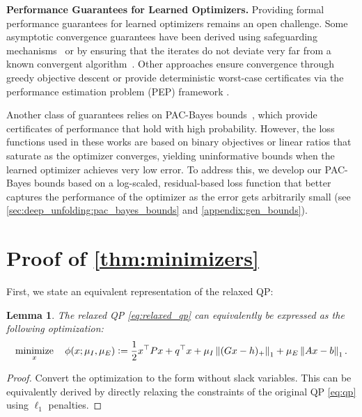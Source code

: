 \documentclass{article} %
\DeclareMathOperator*{\minimize}{minimize}
\newcommand{\norm}[1]{\left\lVert#1\right\rVert}
\newcommand{\defeq}{\vcentcolon=}
\newtheorem{lemma}[theorem]{Lemma}
\begin{document}
\textbf{Performance Guarantees for Learned Optimizers.}
Providing formal performance guarantees for learned optimizers remains an open challenge.
Some asymptotic convergence guarantees have been derived using safeguarding mechanisms~\citep{Heaton2023Safeguarded} or by ensuring that the iterates do not deviate very far from a known convergent algorithm~\citep{Banert2024Accelerated, martin2025learning, martin2026learning}.
%
Other approaches ensure convergence through greedy objective descent \citep{fahy2024greedy} or provide deterministic worst-case certificates via the performance estimation problem (PEP) framework \citep{sambharya2025learning}.

Another class of guarantees relies on PAC-Bayes bounds~\citep{sambharya2025data,Sucker2025Learning,saravanos2025deep,Sucker2025Generalization}, which provide certificates of performance that hold with high probability.
However, the loss functions used in these works are based on binary objectives or linear ratios that saturate as the optimizer converges, yielding uninformative bounds when the learned optimizer achieves very low error.
To address this, we develop our PAC-Bayes bounds based on a log-scaled, residual-based loss function that better captures the performance of the optimizer as the error gets arbitrarily small (see \cref{sec:deep_unfolding:pac_bayes_bounds} and \cref{appendix:gen_bounds}).


\section{Proof of \cref{thm:minimizers}}
\label{appendix:minimizers_proof}
\allowdisplaybreaks

First, we state an equivalent representation of the relaxed QP:
\begin{lemma}
The relaxed QP \cref{eq:relaxed_qp} can equivalently be expressed as the following optimization:
\begin{equation} \label{eq:relaxed_qp_alt}
    \minimize_x \quad \phi(x; \mu_I, \mu_E) \defeq \frac{1}{2} x^\top P x + q^\top x + \mu_I \norm{(Gx - h)_+}_1 + \mu_E \norm{Ax - b}_1.
\end{equation}
\end{lemma}
\begin{proof}
    Convert the optimization to the form without slack variables. This can be equivalently derived by directly relaxing the constraints of the original QP \cref{eq:qp} using $\ell_1$ penalties.
\end{proof}
\end{document}

